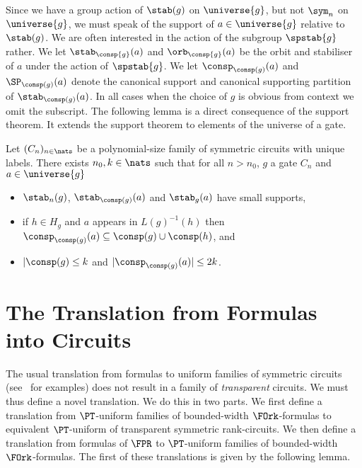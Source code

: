 \documentclass[a4paper,UKenglish]{lipics-v2018}
\begin{document}
Since we have a group action of $\stab(g)$ on $\universe{g}$, but not $\sym_n$
on $\universe{g}$, we must speak of the support of $a \in \universe{g}$ relative
to $\stab(g)$. We are often interested in the action of the subgroup
$\spstab{g}$ rather. We let $\stab_{\consp{g}}(a)$ and $\orb_{\consp{g}}(a)$ be
the orbit and stabiliser of $a$ under the action of $\spstab{g}$. We let
$\consp_{\consp(g)}(a)$ and $\SP_{\consp(g)}(a)$ denote the canonical support
and canonical supporting partition of $\stab_{\consp(g)}(a)$. In all cases when
the choice of $g$ is obvious from context we omit the subscript. The following
lemma is a direct consequence of the support theorem. It extends the support
theorem to elements of the universe of a gate.

\begin{lemma}
  \label{lem:row-column-supports}
  Let $(C_n)_{n \in \nats}$ be a polynomial-size family of symmetric circuits
  with unique labels. There exists $n_0, k \in \nats$ such that for all $n >
  n_0$, $g$ a gate $C_n$ and $a \in \universe{g}$
  \begin{itemize}
  \item $\stab_n(g)$, $\stab_{\consp(g)}(a)$ and $\stab_{g}(a)$ have small
    supports,
  \item if $h \in H_g$ and $a$ appears in $L(g)^{-1}(h)$ then
    $\consp_{\consp(g)}(a) \subseteq \consp(g) \cup \consp(h)$, and
  \item $\vert \consp(g) \leq k$ and $\vert \consp_{\consp(g)}(a) \vert \leq
    2k$.
  \end{itemize}
\end{lemma}


\section{The Translation from Formulas into Circuits}
The usual translation from formulas to uniform families of symmetric circuits
(see~\cite{} for examples) does not result in a family of \emph{transparent}
circuits. We must thus define a novel translation. We do this in two parts. We
first define a translation from $\PT$-uniform families of bounded-width
$\FOrk$-formulas to equivalent $\PT$-uniform of transparent symmetric
rank-circuits. We then define a translation from formulas of $\FPR$ to
$\PT$-uniform families of bounded-width $\FOrk$-formulas. The first of these
translations is given by the following lemma.
\end{document}
